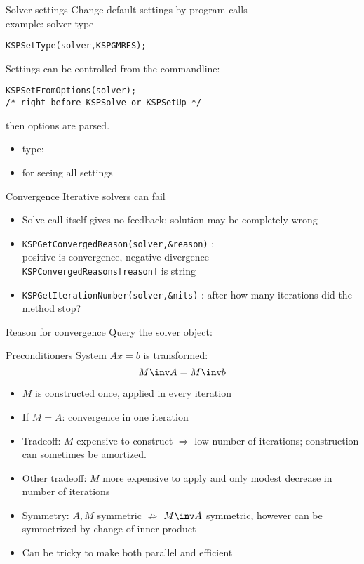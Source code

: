\begin{numberedframe}{Solver settings}
  Change default settings by program calls\\
  example: solver type
\begin{lstlisting}
KSPSetType(solver,KSPGMRES);
\end{lstlisting}

Settings can be controlled from the commandline:
\begin{lstlisting}
KSPSetFromOptions(solver);
/* right before KSPSolve or KSPSetUp */
\end{lstlisting}
then options  are parsed.
\begin{itemize}
\item type: 
\item {} for seeing all settings
\end{itemize}
\end{numberedframe}

\begin{numberedframe}{Convergence}
Iterative solvers can fail
  \begin{itemize}
  \item Solve call itself gives no feedback: solution may be completely wrong
  \item \lstinline{KSPGetConvergedReason(solver,&reason)} : \\
    positive is convergence, negative divergence \\
    \lstinline{KSPConvergedReasons[reason]} is string      
  \item \lstinline{KSPGetIterationNumber(solver,&nits)} : after how many
    iterations did the method stop?
  \end{itemize}
\end{numberedframe}

\begin{numberedframe}{Reason for convergence}
  Query the solver object:
  
\end{numberedframe}

\begin{numberedframe}{Preconditioners}
System $Ax=b$ is transformed:
\[ M\inv A=M\inv b \]
\begin{itemize}
\item $M$ is constructed once, applied in every iteration
\item If $M=A$: convergence in one iteration
\item Tradeoff: $M$ expensive to construct $\Rightarrow$ low number of
  iterations; construction can sometimes be amortized.
\item Other tradeoff: $M$ more expensive to apply and only modest
  decrease in number of iterations
\item Symmetry: $A,M$ symmetric $\not\Rightarrow$ $M\inv A$ symmetric,
  however can be symmetrized by change of inner product
\item Can be tricky to make both parallel and efficient
\end{itemize}
\end{numberedframe}


